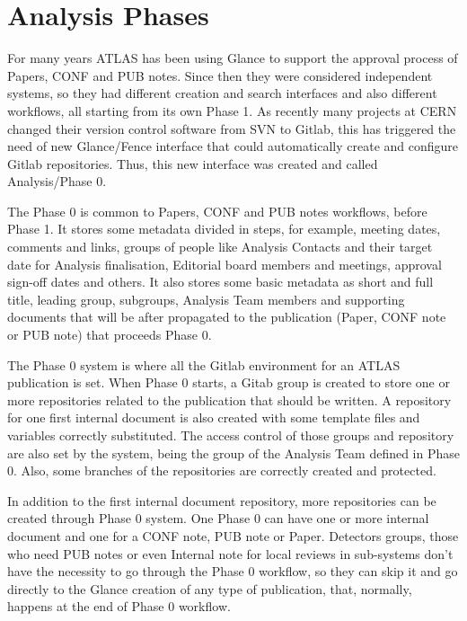 \section{Analysis Phases}
\label{sec:analysis-phases}

For many years ATLAS has been using Glance to support the approval process of Papers, CONF and PUB notes. Since then they were considered independent systems, so they had different creation and search interfaces and also different workflows, all starting from its own Phase 1. As recently many projects at CERN changed their version control software from SVN to Gitlab, this has triggered the need of new Glance/Fence interface that could automatically create and configure Gitlab repositories. Thus, this new interface was created and called Analysis/Phase 0.

The Phase 0 is common to Papers, CONF and PUB notes workflows, before Phase 1. It stores some metadata divided in steps, for example, meeting dates, comments and links, groups of people like Analysis Contacts and their target date for Analysis finalisation, Editorial board members and meetings, approval sign-off dates and others. It also stores some basic metadata as short and full title, leading group, subgroups, Analysis Team members and supporting documents that will be after propagated to the publication (Paper, CONF note or PUB note) that proceeds Phase 0.

The Phase 0 system is where all the Gitlab environment for an ATLAS publication is set. When Phase 0 starts, a Gitab group is created to store one or more repositories related to the publication that should be written. A repository for one first internal document is also created with some template files and variables correctly substituted. The access control of those groups and repository are also set by the system, being the group of the Analysis Team defined in Phase 0. Also, some branches of the repositories are correctly created and protected.

In addition to the first internal document repository, more repositories can be created through Phase 0 system. One Phase 0 can have one or more internal document and one for a CONF note, PUB note or Paper. Detectors groups, those who need PUB notes or even Internal note for local reviews in sub-systems don’t have the necessity to go through the Phase 0 workflow, so they can skip it and go directly to the Glance creation of any type of publication, that, normally, happens at the end of Phase 0 workflow.

